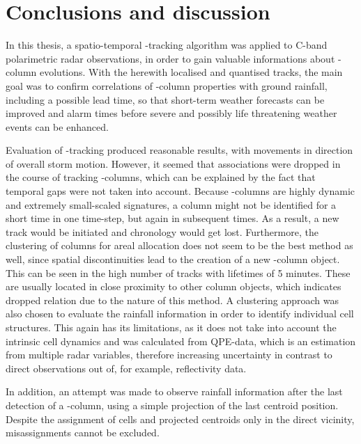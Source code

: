 
\chapter{Conclusions and discussion}
\label{sec:discussion}

In this thesis, a spatio-temporal \zdr-tracking algorithm was applied to C-band polarimetric radar observations, in order to gain valuable informations about \zdr-column evolutions. With the herewith localised and quantised tracks, the main goal was to confirm correlations of \zdr-column properties with ground rainfall, including a possible lead time, so that short-term weather forecasts can be improved and alarm times before severe and possibly life threatening weather events can be enhanced.

Evaluation of \zdr-tracking produced reasonable results, with movements in direction of overall storm motion. 
However, it seemed that associations were dropped in the course of tracking \zdr-columns, which can be explained by the fact that temporal gaps were not taken into account. Because \zdr-columns are highly dynamic and extremely small-scaled signatures, a column might not be identified for a short time in one time-step, but again in subsequent times. As a result, a new track would be initiated and chronology would get lost. 
Furthermore, the clustering of columns for areal allocation does not seem to be the best method as well, since spatial discontinuities lead to the creation of a new \zdr-column object. This can be seen in the high number of tracks with lifetimes of 5 minutes. These are usually located in close proximity to other column objects, which indicates dropped relation due to the nature of this method. 
A clustering approach was also chosen to evaluate the rainfall information in order to identify individual cell structures. This again has its limitations, 
as it does not take into account the intrinsic cell dynamics and was calculated from QPE-data, which is an estimation from multiple radar variables, therefore increasing uncertainty in contrast to direct observations out of, for example, reflectivity data. 

In addition, an attempt was made to observe rainfall information after the last detection of a \zdr-column, using a simple projection of the last centroid position. Despite the assignment of cells and projected centroids only in the direct vicinity, misassignments cannot be excluded.

